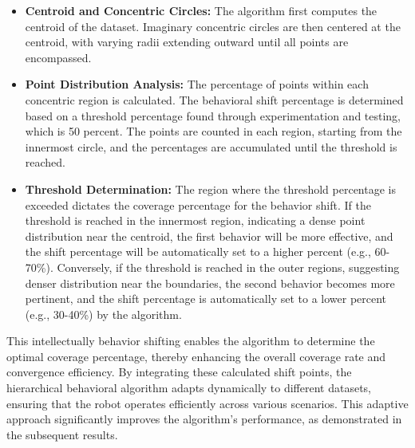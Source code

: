 \begin{itemize}
    \item \textbf{Centroid and Concentric Circles:  }The algorithm first computes the centroid of the dataset. Imaginary concentric circles are then centered at the centroid, with varying radii extending outward until all points are encompassed.
    \item \textbf{Point Distribution Analysis:  }The percentage of points within each concentric region is calculated. The behavioral shift percentage is determined based on a threshold percentage found through experimentation and testing, which is 50 percent. The points are counted in each region, starting from the innermost circle, and the percentages are accumulated until the threshold is reached.
    \item \textbf{Threshold Determination:  }The region where the threshold percentage is exceeded dictates the coverage percentage for the behavior shift. If the threshold is reached in the innermost region, indicating a dense point distribution near the centroid, the first behavior will be more effective, and the shift percentage will be automatically set to a higher percent (e.g., 60-70\%). Conversely, if the threshold is reached in the outer regions, suggesting denser distribution near the boundaries, the second behavior becomes more pertinent, and the shift percentage is automatically set to a lower percent (e.g., 30-40\%) by the algorithm.
\end{itemize} 

\vspace*{6mm}   

This intellectually behavior shifting enables the algorithm to determine the optimal coverage percentage, thereby enhancing the overall coverage rate and convergence efficiency. By integrating these calculated shift points, the hierarchical behavioral algorithm adapts dynamically to different datasets, ensuring that the robot operates efficiently across various scenarios. This adaptive approach significantly improves the algorithm's performance, as demonstrated in the subsequent results.  

\vspace*{6mm}   

